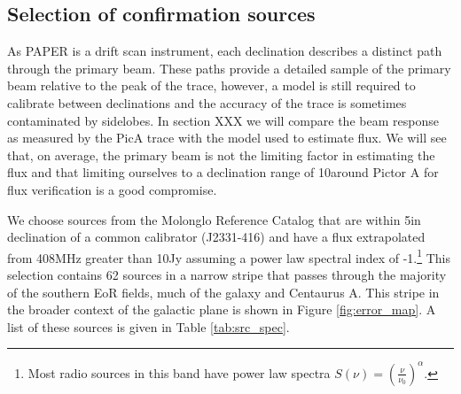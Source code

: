 \documentclass[preprint]{aastex}
\begin{document}
\subsection{Selection of confirmation sources}
As PAPER is a drift scan instrument, each declination describes a distinct path through the primary beam. These paths
provide a detailed sample of the primary beam relative to the peak of the trace, however,
a model is still required to calibrate between declinations and the accuracy of the trace is sometimes contaminated by
sidelobes. In section XXX we will compare the beam response as measured by the PicA trace with the model 
used to estimate flux. We will see that, on average, the primary beam is not the limiting factor in estimating the flux and that
limiting ourselves to a declination range of 10\arcdeg around Pictor A for flux verification is a good compromise.
%
%
%
%
%
%

We choose sources from the Molonglo
Reference Catalog \cite[MRC]{Large:1981p7798} that are within 5\arcdeg in
declination of a common calibrator (J2331-416) and have a flux extrapolated
from 408MHz greater than 10Jy assuming a power law spectral index of
-1.\footnote{Most radio sources in this band have power law spectra $S(\nu) =
\left(\frac{\nu}{\nu_0}\right)^\alpha$. } This selection contains 62 sources in a narrow
stripe that passes through the majority of the southern EoR fields, much of the
galaxy and Centaurus A. This stripe in the broader context of the galactic plane
is shown in Figure \ref{fig:error_map}.
A list of these 
sources is given in Table \ref{tab:src_spec}. 
\end{document}
